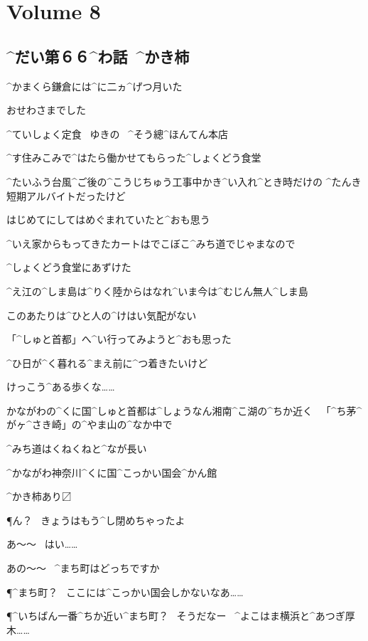 \section{Volume 8}

\subsection{^{だい}{第}６６^{わ}{話}\ ^{かき}{柿}}

\page[4]
\A ^{かまくら}{鎌倉}には^{に}{二}ヵ^{げつ}{月}いた

\A おせわさまでした

\page
\Sign ^{ていしょく}{定食}
\ ゆきの
\ ^{そう}{總}^{ほんてん}{本店}

\A ^{す}{住}みこみで^{はたら}{働}かせてもらった^{しょくどう}{食堂}

\A ^{たいふう}{台風}^{ご}{後}の^{こうじちゅう}{工事中}かき^{い}{入}れ^{とき}{時}だけの
^{たんき}{短期}アルバイトだったけど

\A はじめてにしてはめぐまれていたと^{おも}{思}う

\page[7]
\A ^{いえ}{家}からもってきたカートはでこぼこ^{みち}{道}でじゃまなので

\A ^{しょくどう}{食堂}にあずけた

\page
\A ^{え}{江}の^{しま}{島}は^{りく}{陸}からはなれ^{いま}{今}は^{むじん}{無人}^{しま}{島}

\A このあたりは^{ひと}{人}の^{けはい}{気配}がない

\page
\A 「^{しゅと}{首都}」へ^{い}{行}ってみようと^{おも}{思}った

\A ^{ひ}{日}が^{く}{暮}れる^{まえ}{前}に^{つ}{着}きたいけど

\A けっこう^{ある}{歩}くな……

\A かながわの^{くに}{国}^{しゅと}{首都}は^{しょうなん}{湘南}^{こ}{湖}の^{ちか}{近}く
\ 「^{ち}{茅}^{が}{ヶ}^{さき}{崎}」の^{やま}{山}の^{なか}{中}で

\A ^{みち}{道}はくねくねと^{なが}{長}い

\page
\Sign ^{かながわ}{神奈川}^{くに}{国}^{こっかい}{国会}^{かん}{館}

\Sign ^{かき}{柿}あり〼

\page
\P ん？
\ きょうはもう^{し}{閉}めちゃったよ

\A あ〜〜
\ はい……

\A あの〜〜
\ ^{まち}{町}はどっちですか

\P ^{まち}{町}？
\ ここには^{こっかい}{国会}しかないなあ……

\P ^{いちばん}{一番}^{ちか}{近}い^{まち}{町}？
\ そうだなー
\ ^{よこはま}{横浜}と^{あつぎ}{厚木}……

